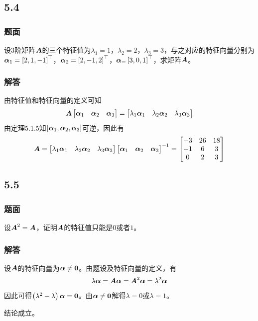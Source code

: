 \documentclass{beamer}
\begin{document}
\subsection*{5.4}
\begin{frame}
    \frametitle{题面}
    设\(3\)阶矩阵\(\boldsymbol{A}\)的三个特征值为\(\lambda_1=1\)，\(\lambda_2=2\)，\(\lambda_3=3\)，与之对应的特征向量分别为\(\boldsymbol{\alpha}_1=\left[ 2,1,-1 \right]^\top\)，\(\boldsymbol{\alpha}_2=\left[ 2,-1,2 \right]^\top\)，\(\boldsymbol{\alpha}_=\left[ 3,0,1 \right]^\top\)，求矩阵\(\boldsymbol{A}\)。
\end{frame}

\begin{frame}
    \frametitle{解答}
    由特征值和特征向量的定义可知
    \begin{equation*}
        \boldsymbol{A}\begin{bmatrix}\boldsymbol{\alpha}_1&\boldsymbol{\alpha}_2&\boldsymbol{\alpha}_3\end{bmatrix}=\begin{bmatrix}\lambda_1\boldsymbol{\alpha}_1&\lambda_2\boldsymbol{\alpha}_2&\lambda_3\boldsymbol{\alpha}_3\end{bmatrix}
    \end{equation*}
    \pause
    由定理5.1.5知\(\left[ \boldsymbol{\alpha}_1,\boldsymbol{\alpha}_2,\boldsymbol{\alpha}_3 \right]\)可逆，因此有
    \begin{equation*}
        \boldsymbol{A}=\begin{bmatrix}\lambda_1\boldsymbol{\alpha}_1&\lambda_2\boldsymbol{\alpha}_2&\lambda_3\boldsymbol{\alpha}_3\end{bmatrix}{\begin{bmatrix}\boldsymbol{\alpha}_1&\boldsymbol{\alpha}_2&\boldsymbol{\alpha}_3\end{bmatrix}}^{-1}=
        \begin{bmatrix}
            -3 & 26 & 18 \\
            -1 & 6  & 3  \\
            0  & 2  & 3
        \end{bmatrix}
    \end{equation*}
\end{frame}

\subsection*{5.5}
\begin{frame}
    \frametitle{题面}
    设\(\boldsymbol{A}^2=\boldsymbol{A}\)，证明\(\boldsymbol{A}\)的特征值只能是\(0\)或者\(1\)。
\end{frame}

\begin{frame}
    \frametitle{解答}
    设\(\boldsymbol{A}\)的特征向量为\(\boldsymbol{\alpha}\neq\boldsymbol{0}\)。由题设及特征向量的定义，有
    \begin{equation*}
        \lambda\boldsymbol{\alpha}=\boldsymbol{A}\boldsymbol{\alpha}=\boldsymbol{A}^2\boldsymbol{\alpha}=\lambda^2\boldsymbol{\alpha}
    \end{equation*}
    \pause
    因此可得\(\left( \lambda^2-\lambda \right)\boldsymbol{\alpha}=\boldsymbol{0}\)。由\(\boldsymbol{\alpha}\neq\boldsymbol{0}\)解得\(\lambda=0\)或\(\lambda=1\)。

    结论成立。
\end{frame}
\end{document}
